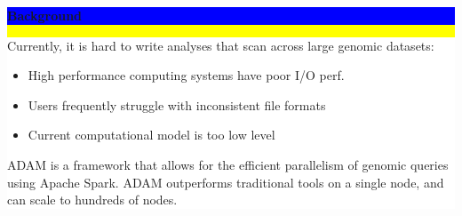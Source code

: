 \documentclass[11pt]{a0poster}
\begin{document}
{\color{Blue}\noindent\makebox[\linewidth]{\rule{\paperwidth}{30pt}}}

\noindent\colorbox{Yellow}{
\begin{minipage}[t][2045pt][t]{\linewidth}

\noindent\begin{minipage}{0.025\linewidth}
\hfill
\pagebreak
\end{minipage}
\begin{minipage}{0.3\linewidth}
\vspace{75pt}
\colorbox{Blue}{
\begin{minipage}{\linewidth}
\vspace{25pt}
\begin{center}
\Huge \bf \color{White} Background
\end{center}
\vspace{10pt}
\end{minipage}
}
\colorbox{White}{
\begin{minipage}[t][600pt][t]{\linewidth}
\color{Blue}
\vspace{20pt}
\LARGE Currently, it is hard to write analyses that scan across large genomic
datasets:

\vspace{33pt}
\begin{itemize}
\item High performance computing systems have poor I/O perf.
\item Users frequently struggle with inconsistent file formats
\item Current computational model is too low level
\end{itemize}
\vspace{33pt}

ADAM is a framework that allows for the efficient parallelism of genomic queries
using Apache Spark. ADAM outperforms traditional tools on a single node, and
can scale to hundreds of nodes.
\hfill
\pagebreak
\end{minipage}
}


\end{minipage}
\end{minipage}}
\end{document}
